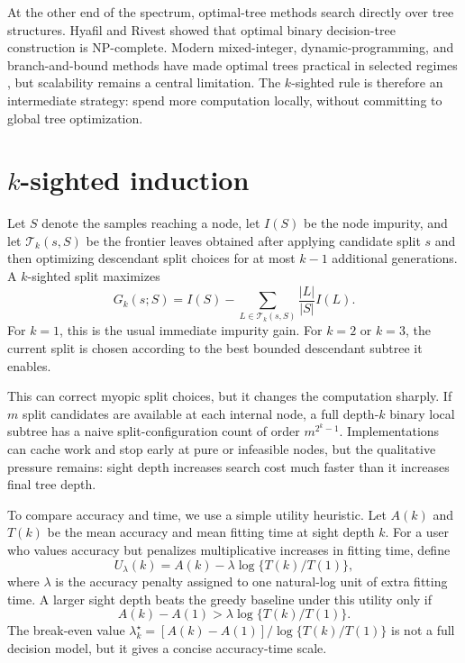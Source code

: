 \documentclass[final,5p,times]{elsarticle}
\begin{document}
At the other end of the spectrum, optimal-tree methods search directly over tree structures. Hyafil and Rivest \cite{hyafil1976constructing} showed that optimal binary decision-tree construction is NP-complete. Modern mixed-integer, dynamic-programming, and branch-and-bound methods have made optimal trees practical in selected regimes \cite{bertsimas2017optimal,verwer2019learning,hu2019optimal,lin2020generalized,aghaei2025strong}, but scalability remains a central limitation. The $k$-sighted rule is therefore an intermediate strategy: spend more computation locally, without committing to global tree optimization.

\section{\texorpdfstring{$k$}{k}-sighted induction}

Let $S$ denote the samples reaching a node, let $I(S)$ be the node impurity, and let $\mathcal{T}_k(s,S)$ be the frontier leaves obtained after applying candidate split $s$ and then optimizing descendant split choices for at most $k-1$ additional generations. A $k$-sighted split maximizes
\begin{equation}
G_k(s;S) =
I(S) -
\sum_{L \in \mathcal{T}_k(s,S)}
\frac{|L|}{|S|} I(L).
\label{eq:sighted}
\end{equation}
For $k=1$, this is the usual immediate impurity gain. For $k=2$ or $k=3$, the current split is chosen according to the best bounded descendant subtree it enables.

This can correct myopic split choices, but it changes the computation sharply. If $m$ split candidates are available at each internal node, a full depth-$k$ binary local subtree has a naive split-configuration count of order $m^{2^k-1}$. Implementations can cache work and stop early at pure or infeasible nodes, but the qualitative pressure remains: sight depth increases search cost much faster than it increases final tree depth.

To compare accuracy and time, we use a simple utility heuristic. Let $A(k)$ and $T(k)$ be the mean accuracy and mean fitting time at sight depth $k$. For a user who values accuracy but penalizes multiplicative increases in fitting time, define
\begin{equation}
U_\lambda(k)=A(k)-\lambda \log\{T(k)/T(1)\},
\label{eq:utility}
\end{equation}
where $\lambda$ is the accuracy penalty assigned to one natural-log unit of extra fitting time. A larger sight depth beats the greedy baseline under this utility only if
\begin{equation}
A(k)-A(1) > \lambda \log\{T(k)/T(1)\}.
\end{equation}
The break-even value $\lambda^\star_k=[A(k)-A(1)]/\log\{T(k)/T(1)\}$ is not a full decision model, but it gives a concise accuracy-time scale.
\end{document}
